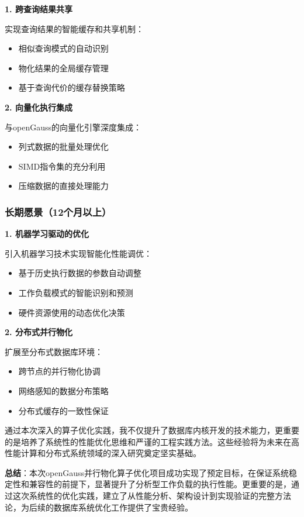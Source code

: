 \textbf{1. 跨查询结果共享}

实现查询结果的智能缓存和共享机制：
\begin{itemize}
    \item 相似查询模式的自动识别
    \item 物化结果的全局缓存管理
    \item 基于查询代价的缓存替换策略
\end{itemize}

\textbf{2. 向量化执行集成}

与openGauss的向量化引擎深度集成：
\begin{itemize}
    \item 列式数据的批量处理优化
    \item SIMD指令集的充分利用
    \item 压缩数据的直接处理能力
\end{itemize}

\subsubsection{长期愿景（12个月以上）}

\textbf{1. 机器学习驱动的优化}

引入机器学习技术实现智能化性能调优：
\begin{itemize}
    \item 基于历史执行数据的参数自动调整
    \item 工作负载模式的智能识别和预测
    \item 硬件资源使用的动态优化决策
\end{itemize}

\textbf{2. 分布式并行物化}

扩展至分布式数据库环境：
\begin{itemize}
    \item 跨节点的并行物化协调
    \item 网络感知的数据分布策略
    \item 分布式缓存的一致性保证
\end{itemize}

通过本次深入的算子优化实践，我不仅提升了数据库内核开发的技术能力，更重要的是培养了系统性的性能优化思维和严谨的工程实践方法。这些经验将为未来在高性能计算和分布式系统领域的深入研究奠定坚实基础。

\textbf{总结}：本次openGauss并行物化算子优化项目成功实现了预定目标，在保证系统稳定性和兼容性的前提下，显著提升了分析型工作负载的执行性能。更重要的是，通过这次系统性的优化实践，建立了从性能分析、架构设计到实现验证的完整方法论，为后续的数据库系统优化工作提供了宝贵经验。